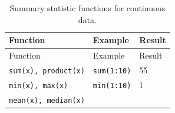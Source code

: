 \documentclass[]{book}
\theoremstyle{definition}
\theoremstyle{definition}
\theoremstyle{remark}
\begin{document}
\begin{longtable}[]{@{}lll@{}}
\caption{\label{tab:continuousvectorfunctiontable} Summary statistic
functions for continuous data.}\tabularnewline
\toprule
\begin{minipage}[b]{0.27\columnwidth}\raggedright\strut
Function\strut
\end{minipage} & \begin{minipage}[b]{0.30\columnwidth}\raggedright\strut
Example\strut
\end{minipage} & \begin{minipage}[b]{0.32\columnwidth}\raggedright\strut
Result\strut
\end{minipage}\tabularnewline
\midrule
\endfirsthead
\toprule
\begin{minipage}[b]{0.27\columnwidth}\raggedright\strut
Function\strut
\end{minipage} & \begin{minipage}[b]{0.30\columnwidth}\raggedright\strut
Example\strut
\end{minipage} & \begin{minipage}[b]{0.32\columnwidth}\raggedright\strut
Result\strut
\end{minipage}\tabularnewline
\midrule
\endhead
\begin{minipage}[t]{0.27\columnwidth}\raggedright\strut
\texttt{sum(x),\ product(x)}\strut
\end{minipage} & \begin{minipage}[t]{0.30\columnwidth}\raggedright\strut
\texttt{sum(1:10)}\strut
\end{minipage} & \begin{minipage}[t]{0.32\columnwidth}\raggedright\strut
55\strut
\end{minipage}\tabularnewline
\begin{minipage}[t]{0.27\columnwidth}\raggedright\strut
\texttt{min(x),\ max(x)}\strut
\end{minipage} & \begin{minipage}[t]{0.30\columnwidth}\raggedright\strut
\texttt{min(1:10)}\strut
\end{minipage} & \begin{minipage}[t]{0.32\columnwidth}\raggedright\strut
1\strut
\end{minipage}\tabularnewline
\begin{minipage}[t]{0.27\columnwidth}\raggedright\strut
\texttt{mean(x),\ median(x)}\strut
\end{minipage} & \begin{minipage}[t]{0.30\columnwidth}\raggedright\strut

\end{minipage}
\end{longtable}
\end{document}
